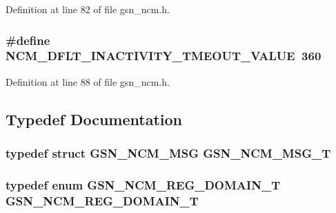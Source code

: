 Definition at line 82 of file gsn\_\-ncm.h.

\hypertarget{a00529_abb43ee4a73e404382808c773bee9f98b}{
\subsubsection[{NCM\_\-DFLT\_\-INACTIVITY\_\-TMEOUT\_\-VALUE}]{\setlength{\rightskip}{0pt plus 5cm}\#define NCM\_\-DFLT\_\-INACTIVITY\_\-TMEOUT\_\-VALUE~360}}
\label{a00529_abb43ee4a73e404382808c773bee9f98b}


Definition at line 88 of file gsn\_\-ncm.h.



\subsection{Typedef Documentation}
\hypertarget{a00529_aad1d86cebf715133449a991798027533}{
\subsubsection[{GSN\_\-NCM\_\-MSG\_\-T}]{\setlength{\rightskip}{0pt plus 5cm}typedef struct {\bf GSN\_\-NCM\_\-MSG} {\bf GSN\_\-NCM\_\-MSG\_\-T}}}
\label{a00529_aad1d86cebf715133449a991798027533}
\hypertarget{a00529_a6860aabee0941013271f1956b85eb8b6}{
\subsubsection[{GSN\_\-NCM\_\-REG\_\-DOMAIN\_\-T}]{\setlength{\rightskip}{0pt plus 5cm}typedef enum {\bf GSN\_\-NCM\_\-REG\_\-DOMAIN\_\-T}  {\bf GSN\_\-NCM\_\-REG\_\-DOMAIN\_\-T}}}
\label{a00529_a6860aabee0941013271f1956b85eb8b6}


